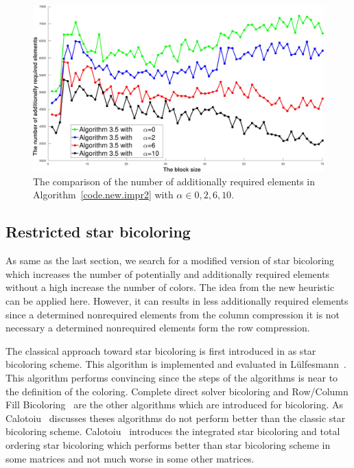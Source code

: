 \documentclass[12pt, twoside,a4paper,toc=bibliography]{scrbook}
\newcommand{\coderef}[1]{Algorithm~\protect\ref{#1}}
\begin{document}
\begin{figure}
\centering
\includegraphics[width=0.9\linewidth]{ex33_alg35_alpha_0_2_6_10_bls_lfo_adds}
\caption{
The comparison of the number of additionally required elements in \coderef{code.new.impr2}
with $\alpha\in{0,2,6,10}$.}
\label{ex33_alg35_alpha_0_2_6_10_bls_lfo_adds}
\end{figure}


\clearpage
\subsection{Restricted star bicoloring}
\label{s.heuristic.starbicoloring}
As same as the last section, we search for a modified version of star bicoloring
which increases the number of potentially and additionally required elements without
a high increase the number of colors. The idea from the new heuristic
can be applied here. However, it can results in less additionally required
elements since a determined nonrequired elements from the column compression
it is not necessary a determined nonrequired elements form the row compression.

The classical approach toward star bicoloring is first introduced in
\cite{Gebremedhin05whatcolor} as star bicoloring scheme.
This algorithm is implemented and evaluated in
Lülfesmann~\cite{LulfesmannMaster}. This algorithm performs convincing
since the steps of the algorithms is near to the definition of the coloring.
Complete direct solver bicoloring and Row/Column Fill Bicoloring~\cite{Hossain95computinga}
are the other algorithms which are introduced for bicoloring.
As Calotoiu~\cite{CalotoiuMaster} discusses theses algorithms do not perform
better than the classic star bicoloring scheme.
Calotoiu~\cite{CalotoiuMaster} introduces the integrated star bicoloring
and total ordering star bicoloring which performs better than
star bicoloring scheme in some matrices and not much worse in some other
matrices.
\end{document}
